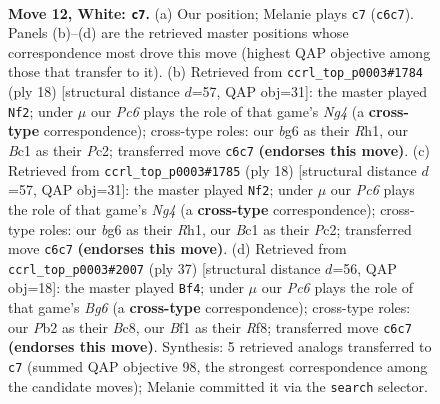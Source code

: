 \documentclass[11pt]{article}
\begin{document}
\clearpage

\begin{figure}[p]\centering
\begin{subfigure}{0.46\textwidth}\centering
\resizebox{\linewidth}{!}{%
\newchessgame
\chessboard[
  setfen={rn2kbnr/p5p1/2P3bp/4pp2/2p4P/6NR/PP3PP1/R1BK1BN1 w kq - 0 12},
  showmover=false,
  pgfstyle=straightmove, color=movearrow, markmove={c6-c7}
]}
\caption{}
\end{subfigure}\hfill
\begin{subfigure}{0.46\textwidth}\centering
\resizebox{\linewidth}{!}{%
\newchessgame
\chessboard[
  setfen={rnb1k1nr/ppp1bp1p/3p4/8/3P1pNP/8/PPP3P1/RNB1KB1R w KQkq - 0 10},
  showmover=false,
  pgfstyle=straightmove, color=movearrow, markmove={g4-f2}
]}
\caption{}
\end{subfigure}
\\[4pt]
\begin{subfigure}{0.46\textwidth}\centering
\resizebox{\linewidth}{!}{%
\newchessgame
\chessboard[
  setfen={rnb1k1nr/ppp1bp1p/3p4/8/3P1pNP/8/PPP3P1/RNB1KB1R w KQkq - 0 10},
  showmover=false,
  pgfstyle=straightmove, color=movearrow, markmove={g4-f2}
]}
\caption{}
\end{subfigure}\hfill
\begin{subfigure}{0.46\textwidth}\centering
\resizebox{\linewidth}{!}{%
\newchessgame
\chessboard[
  setfen={r1b2rk1/1ppn4/p1n1p3/3p4/B2P2N1/2P1R1b1/PP1N2P1/R1B4K b - - 0 19},
  showmover=false,
  pgfstyle=straightmove, color=movearrow, markmove={g3-f4}
]}
\caption{}
\end{subfigure}
\caption{\textbf{Move 12, White: \texttt{c7}.} (a) Our position; Melanie plays \texttt{c7} (\texttt{c6c7}). Panels (b)--(d) are the retrieved master positions whose correspondence most drove this move (highest QAP objective among those that transfer to it). (b) Retrieved from \texttt{ccrl\_top\_p0003\#1784} (ply 18) [structural distance $d$=57, QAP obj=31]: the master played \texttt{Nf2}; under $\mu$ our \emph{Pc6} plays the role of that game's \emph{Ng4} (a \textbf{cross-type} correspondence); cross-type roles: our \emph{b}g6 as their \emph{R}h1, our \emph{B}c1 as their \emph{P}c2; transferred move \texttt{c6c7} \textbf{(endorses this move)}. (c) Retrieved from \texttt{ccrl\_top\_p0003\#1785} (ply 18) [structural distance $d$=57, QAP obj=31]: the master played \texttt{Nf2}; under $\mu$ our \emph{Pc6} plays the role of that game's \emph{Ng4} (a \textbf{cross-type} correspondence); cross-type roles: our \emph{b}g6 as their \emph{R}h1, our \emph{B}c1 as their \emph{P}c2; transferred move \texttt{c6c7} \textbf{(endorses this move)}. (d) Retrieved from \texttt{ccrl\_top\_p0003\#2007} (ply 37) [structural distance $d$=56, QAP obj=18]: the master played \texttt{Bf4}; under $\mu$ our \emph{Pc6} plays the role of that game's \emph{Bg6} (a \textbf{cross-type} correspondence); cross-type roles: our \emph{P}b2 as their \emph{B}c8, our \emph{B}f1 as their \emph{R}f8; transferred move \texttt{c6c7} \textbf{(endorses this move)}. Synthesis: 5 retrieved analogs transferred to \texttt{c7} (summed QAP objective 98, the strongest correspondence among the candidate moves); Melanie committed it via the \texttt{search} selector.}
\label{fig:thought-m22}
\end{figure}
\end{document}
